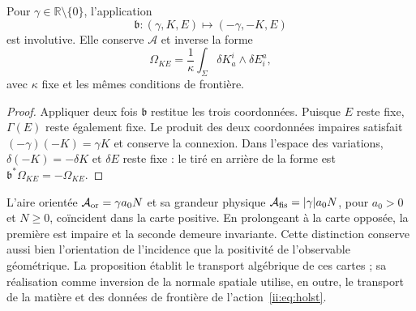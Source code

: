 \begin{proposition}
\label{ii:prop:ii-costura-barbero}
Pour \(\gamma\in\mathbb R\setminus\{0\}\), l'application
\[
 \mathfrak b:(\gamma,K,E)\longmapsto(-\gamma,-K,E)
\]
est involutive. Elle conserve \(\mathcal A\) et inverse la forme
\[
 \Omega_{KE}=\frac1\kappa\int_\Sigma
 \delta K_a^i\wedge\delta E^a_i,
\]
avec \(\kappa\) fixe et les mêmes conditions de frontière.
\end{proposition}
\begin{proof}
Appliquer deux fois \(\mathfrak b\) restitue les trois coordonnées.
Puisque \(E\) reste fixe, \(\Gamma(E)\) reste également fixe.
Le produit des deux coordonnées impaires satisfait
\((-\gamma)(-K)=\gamma K\) et conserve la connexion.
Dans l'espace des variations, \(\delta(-K)=-\delta K\) et
\(\delta E\) reste fixe : le tiré en arrière de la forme est
\(\mathfrak b^*\Omega_{KE}=-\Omega_{KE}\).
\end{proof}

L'aire orientée \(\mathcal A_{\rm or}=\gamma a_0N\) et sa
grandeur physique \(\mathcal A_{\rm fis}=|\gamma|a_0N\), pour
\(a_0>0\) et \(N\geq0\), coïncident dans la carte positive.
En prolongeant à la carte opposée, la première est impaire et la seconde
demeure invariante. Cette distinction conserve aussi bien l'orientation
de l'incidence que la positivité de l'observable géométrique.
La proposition établit le transport algébrique de ces cartes ;
sa réalisation comme inversion de la normale spatiale utilise,
en outre, le transport de la matière et des données de frontière
de l'action~\eqref{ii:eq:holst}.
